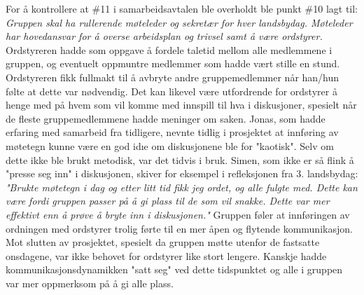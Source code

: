 For å kontrollere at \#11 i samarbeidsavtalen ble overholdt ble punkt \#10 lagt til: \textit{Gruppen skal ha rullerende møteleder og sekretær for hver landsbydag. Møteleder har hovedansvar for å overse arbeidsplan og trivsel samt å være ordstyrer.}
Ordstyreren hadde som oppgave å fordele taletid mellom alle medlemmene i gruppen, og eventuelt oppmuntre medlemmer som hadde vært stille en stund.
Ordstyreren fikk fullmakt til å avbryte andre gruppemedlemmer når han/hun følte at dette var nødvendig.
Det kan likevel være utfordrende for ordstyrer å henge med på hvem som vil komme med innspill til hva i diskusjoner, spesielt når de fleste gruppemedlemmene hadde meninger om saken.
Jonas, som hadde erfaring med samarbeid fra tidligere, nevnte tidlig i prosjektet at innføring av møtetegn kunne være en god id\i{e} om diskusjonene ble for "kaotisk".
Selv om dette ikke ble brukt metodisk, var det tidvis i bruk.
Simen, som ikke er så flink å "presse seg inn" i diskusjonen, skiver for eksempel i refleksjonen fra 3. landsbydag: \textit{"Brukte møtetegn i dag og etter litt tid fikk jeg ordet, og alle fulgte med. Dette kan være fordi gruppen passer på å gi plass til de som vil snakke. Dette var mer effektivt enn å prøve å bryte inn i diskusjonen."}
Gruppen føler at innføringen av ordningen med ordstyrer trolig førte til en mer åpen og flytende kommunikasjon.
Mot slutten av prosjektet, spesielt da gruppen møtte utenfor de fastsatte onsdagene, var ikke behovet for ordstyrer like stort lengere.
Kanskje hadde kommunikasjonsdynamikken "satt seg" ved dette tidspunktet og alle i gruppen var mer oppmerksom på å gi alle plass. \\

